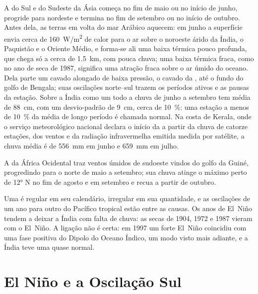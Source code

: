 A  do Sul e do Sudeste da Ásia começa no fim de maio ou no início de junho, progride
para nordeste e termina no fim de setembro ou no início de outubro. Antes dela, as terras em volta do
mar Arábico aquecem: em junho a superfície envia cerca de \qty{160}{W/m^2} de calor para o ar sobre
o noroeste árido da Índia, o Paquistão e o Oriente Médio, e forma-se ali uma baixa térmica pouco profunda,
que chega só a cerca de \qty{1.5}{km}, com pouca chuva; uma baixa térmica fraca, como no ano de seca
de 1987, significa uma atração fraca sobre o ar úmido do oceano. Dela parte um cavado alongado de baixa pressão, o cavado
da , até o fundo do golfo de Bengala; suas oscilações norte--sul trazem os períodos
ativos e as pausas da estação. Sobre a Índia como um todo a chuva de junho a setembro tem média de
\qty{88}{cm}, com um desvio-padrão de \qty{9}{cm}, cerca de \qty{10}{\percent}: uma estação a menos de
\qty{10}{\percent} da média de longo período é chamada normal. Na costa de Kerala, onde o
serviço meteorológico nacional declara o início da  a partir da chuva de catorze estações,
dos ventos e da radiação infravermelha emitida medida por satélite, a chuva média é de
\qty{556}{mm} em junho e \qty{659}{mm} em julho.

A  da África Ocidental traz ventos úmidos de sudoeste vindos do golfo da Guiné, progredindo
para o norte de maio a setembro; sua chuva atinge o máximo perto de \ang{12} N no fim de agosto e em setembro e
recua a partir de outubro.

Uma  é regular em seu calendário, irregular em sua quantidade, e as oscilações de um ano para outro do
Pacífico tropical estão entre as causas. Os anos de El~Niño tendem a deixar a Índia com falta de chuva: as
secas de 1904, 1972 e 1987 vieram com o El~Niño. A ligação não é certa: em 1997 um forte
El~Niño coincidiu com uma fase positiva do Dipolo do Oceano Índico, um modo visto mais adiante, e a Índia
teve uma  quase normal.

\section{El Niño e a Oscilação Sul}\label{sec:b2:climate-variability:enso}

